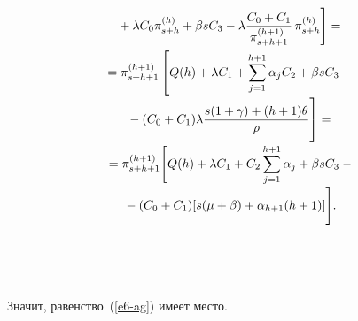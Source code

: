 \begin{multicols}{2}
\begin{multline*}
\left.{}+\lambda 
C_0\pi^{(h)}_{s+h} +\beta s C_3 -
\lambda\fr{C_0+C_1}{\pi^{(h+1)}_{s+h+1}}\,\pi^{(h)}_{s+h}\right]={}\\
  {}= \pi^{(h+1)}_{s+h+1} \left[ 
  Q(h) +\lambda C_1+ \sum\limits_{j=1}^{h+1} 
\alpha_j C_2 +\beta s C_3- {}\right.\\[-2pt]
\left.  {}-  (C_0+C_1)\lambda \fr{s(1+\gamma)+(h+1)\theta}{\rho} 
\vphantom{\sum\limits_{j=1}^{h+1}}
\right]={}\\[-2pt]
{}=  \pi^{(h+1)}_{s+h+1} \Bigg[ Q(h)+\lambda C_1+ C_2 \sum\limits_{j=1}^{h+1} 
\alpha_j +\beta s C_3 -{}\\[-2pt]
{}-(C_0+C_1) [ s(\mu+\beta)+\alpha_{h+1} (h+1)]\Bigg].
  \end{multline*} 
  
\begin{figure*}[b] %
\vspace*{1pt}
\begin{minipage}[t]{80mm}
      \begin{center}
     \mbox{%
\epsfxsize=79mm 
}
\end{center}
\vspace*{-9pt}
\end{minipage}
\hfill
\vspace*{1pt}
\begin{minipage}[t]{80mm}
      \begin{center}
     \mbox{%
\epsfxsize=79mm 
}
\end{center}
\vspace*{-9pt}
\end{minipage}
\end{figure*}
  
 \vspace*{-6pt}
  
Значит, равенство~(\ref{e6-ag}) имеет место. 

\pagebreak


\end{multicols}
